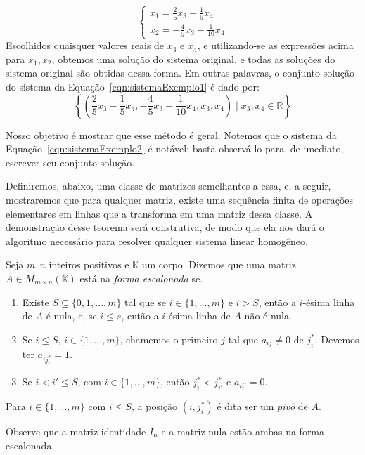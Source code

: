 \begin{equation*}
    \begin{cases}
        x_1 = \frac{2}{5}x_3 - \frac{1}{5}x_4 \\
        x_2 = -\frac{4}{5}x_3 - \frac{1}{10}x_4
    \end{cases}
\end{equation*}
Escolhidos quaisquer valores reais de $x_3$ e $x_4$, e utilizando-se as expressões acima para $x_1, x_2$, obtemos uma solução do sistema original, e todas as soluções do sistema original são obtidas dessa forma.
Em outras palavras, o conjunto solução do sistema da Equação~\eqref{eqn:sistemaExemplo1} é dado por:
\begin{equation*}
    \left\{\left(\frac{2}{5}x_3 - \frac{1}{5}x_4, -\frac{4}{5}x_3 - \frac{1}{10}x_4, x_3, x_4\right) \mid x_3, x_4 \in \mathbb R\right\}
\end{equation*}

Nosso objetivo é mostrar que esse método é geral.
Notemos que o sistema da Equação~\eqref{eqn:sistemaExemplo2} é notável: basta observá-lo para, de imediato, escrever seu conjunto solução.

Definiremos, abaixo, uma classe de matrizes semelhantes a essa, e, a seguir, mostraremos que para qualquer matriz, existe uma sequência finita de operações elementares em linhas que a transforma em uma matriz dessa classe.
A demonstração desse teorema será construtiva, de modo que ela nos dará o algoritmo necessário para resolver qualquer sistema linear homogêneo.

\begin{definition}
    Seja $m, n$ inteiros positivos e $\mathbb K$ um corpo.
    Dizemos que uma matriz $A\in M_{m \times n}(\mathbb K)$ está na \emph{forma escalonada} se.
    \begin{enumerate}
        \item Existe $S \subseteq \{0, 1, \ldots, m\}$ tal que se $i \in \{1, \ldots, m\}$ e $i>S$, então a $i$-ésima linha de $A$ é nula, e, se $i\leq s$, então a $i$-ésima linha de $A$ não é nula.
        \item Se $i\leq S$, $i \in \{1, \ldots, m\}$, chamemos o primeiro $j$ tal que $a_{ij}\neq 0$ de $j^*_i$. Devemos ter $a_{ij^*_i}=1$.
        \item Se $i<i'\leq S$, com $i\in \{1, \ldots, m\}$, então $j^*_i < j^*_{i'}$ e $a_{ii'}=0$.
    \end{enumerate}

    Para $i \in \{1, \ldots, m\}$ com $i\leq S$, a posição $(i, j^*_i)$ é dita ser um \emph{pivô} de $A$.
\end{definition}
Observe que a matriz identidade $I_n$ e a matriz nula estão ambas na forma escalonada.

